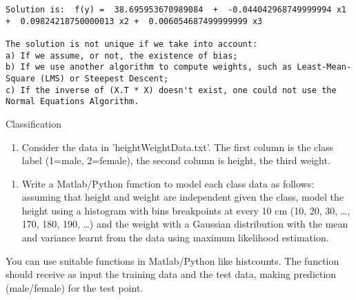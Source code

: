 \documentclass[11pt]{article}
\providecommand{\tightlist}{%
      \setlength{\itemsep}{0pt}\setlength{\parskip}{0pt}}
\begin{document}
    \begin{Verbatim}[commandchars=\\\{\}]
Solution is:  f(y) =  38.695953670989084  +  -0.044042968749999994 x1 +  0.09824218750000013 x2 +  0.006054687499999999 x3

The solution is not unique if we take into account: 
a) If we assume, or not, the existence of bias; 
b) If we use another algorithm to compute weights, such as Least-Mean-Square (LMS) or Steepest Descent;
c) If the inverse of (X.T * X) doesn't exist, one could not use the Normal Equations Algorithm.

    \end{Verbatim}

    Classification

\begin{enumerate}
\def\labelenumi{\arabic{enumi}.}
\setcounter{enumi}{1}
\tightlist
\item
  Consider the data in 'heightWeightData.txt'. The first column is the
  class label (1=male, 2=female), the second column is height, the third
  weight.
\end{enumerate}

\begin{enumerate}
\def\labelenumi{\alph{enumi})}
\tightlist
\item
  Write a Matlab/Python function to model each class data as follows:
  assuming that height and weight are independent given the class, model
  the height using a histogram with bins breakpoints at every 10 cm (10,
  20, 30, \ldots{}, 170, 180, 190, \ldots{}) and the weight with a
  Gaussian distribution with the mean and variance learnt from the data
  using maximum likelihood estimation.
\end{enumerate}

You can use suitable functions in Matlab/Python like histcounts. The
function should receive as input the training data and the test data,
making prediction (male/female) for the test point.
\end{document}
